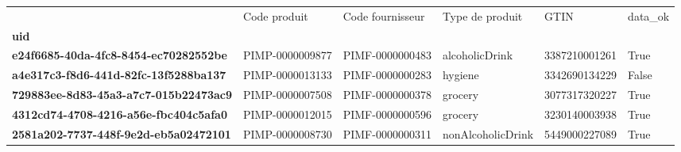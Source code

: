 \begin{tabularx}{\linewidth}{lXXXXX}
\toprule
{} &     Code produit & Code fournisseur &    Type de produit &           GTIN &  data\_ok \\
\textbf{uid                                 } &                  &                  &                    &                &          \\
\midrule
\textbf{e24f6685-40da-4fc8-8454-ec70282552be} &  PIMP-0000009877 &  PIMF-0000000483 &     alcoholicDrink &  3387210001261 &     True \\
\textbf{a4e317c3-f8d6-441d-82fc-13f5288ba137} &  PIMP-0000013133 &  PIMF-0000000283 &            hygiene &  3342690134229 &    False \\
\textbf{729883ee-8d83-45a3-a7c7-015b22473ac9} &  PIMP-0000007508 &  PIMF-0000000378 &            grocery &  3077317320227 &     True \\
\textbf{4312cd74-4708-4216-a56e-fbc404c5afa0} &  PIMP-0000012015 &  PIMF-0000000596 &            grocery &  3230140003938 &     True \\
\textbf{2581a202-7737-448f-9e2d-eb5a02472101} &  PIMP-0000008730 &  PIMF-0000000311 &  nonAlcoholicDrink &  5449000227089 &     True \\
\bottomrule
\end{tabularx}
